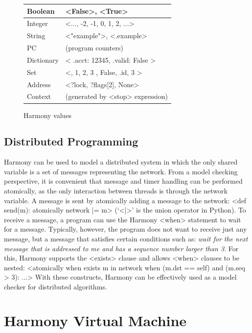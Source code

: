 \documentclass[twocolumn]{article}
\begin{document}
\begin{figure}
\begin{tabular}{|l|l|}
\hline
Boolean & <{False}>, <{True}> \\
\hline
Integer & <{..., -2, -1, 0, 1, 2, ...}> \\
\hline
String & <{"example"}>, <{.example}> \\
\hline
PC & (program counters) \\
\hline
Dictionary & <{{ .acct: 12345, .valid: False }}> \\
\hline
Set & <{{}, { 1, 2, 3 }, { False, .id, 3 }}> \\
\hline
Address & <{?lock, ?flags[2], None}> \\
\hline
Context & (generated by <{stop}> expression) \\
\hline
\end{tabular}
\caption{Harmony values}
\label{fig:values}
\end{figure}

\subsection{Distributed Programming}

Harmony can be used to model a distributed system in which the
only shared variable is a set of messages representing the network.
From a model checking perspective, it is convenient that message and
timer handling can be performed atomically, as the only interaction
between threads is through the network variable.
A message is sent by atomically adding a message to the network:
<{def send(m): atomically network |= {m}}> (`<{|}>' is the union
operator in Python).
To receive a message, a program can use the Harmony <{when}>
statement to wait for a message.  Typically, however, the program
does not want to receive just any message, but a message that satisfies
certain conditions such as: \emph{wait for the next message that is addressed
to me and has a sequence number larger than 3}.
For this, Harmony supports the <{exists}> clause and allows
<{when}> clauses to be nested:
<{atomically when exists m in network when (m.dst == self) and (m.seq > 3): ...}>
With these constructs, Harmony can be effectively used as a
model checker for distributed algorithms.

\section{Harmony Virtual Machine}
\end{document}
